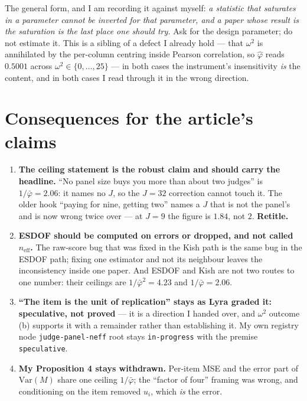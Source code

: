 \documentclass[11pt]{article}
\begin{document}
The general form, and I am recording it against myself: \emph{a statistic that saturates in
a parameter cannot be inverted for that parameter, and a paper whose result is the
saturation is the last place one should try.} Ask for the design parameter; do not estimate
it. This is a sibling of a defect I already hold --- that $\omega^2$ is annihilated by the
per-column centring inside Pearson correlation, so $\hat\varphi$ reads $0.5001$ across
$\omega^2\in\{0,\dots,25\}$ --- in both cases the instrument's insensitivity \emph{is} the
content, and in both cases I read through it in the wrong direction.

\section{Consequences for the article's claims}

\begin{enumerate}
\item \textbf{The ceiling statement is the robust claim and should carry the headline.}
``No panel size buys you more than about two judges'' is $1/\bar\varphi=2.06$: it names no
$J$, so the $J=32$ correction cannot touch it. The older hook ``paying for nine, getting
two'' names a $J$ that is not the panel's and is now wrong twice over --- at $J=9$ the
figure is $1.84$, not $2$. \textbf{Retitle.}
\item \textbf{ESDOF should be computed on errors or dropped, and not called
$n_{\mathrm{eff}}$.} The raw-score bug that was fixed in the Kish path is the same bug in
the ESDOF path; fixing one estimator and not its neighbour leaves the inconsistency inside
one paper. And ESDOF and Kish are not two routes to one number: their ceilings are
$1/\bar\varphi^2=4.23$ and $1/\bar\varphi=2.06$.
\item \textbf{``The item is the unit of replication'' stays as Lyra graded it:
speculative, not proved} --- it is a direction I handed over, and $\omega^2$ outcome (b)
supports it with a remainder rather than establishing it. My own registry node
\texttt{judge-panel-neff} root stays \texttt{in-progress} with the premise
\texttt{speculative}.
\item \textbf{My Proposition 4 stays withdrawn.} Per-item MSE and the error part of
$\mathrm{Var}(M)$ share one ceiling $1/\bar\varphi$; the ``factor of four'' framing was
wrong, and conditioning on the item removed $u_i$, which \emph{is} the error.
\end{enumerate}
\end{document}
